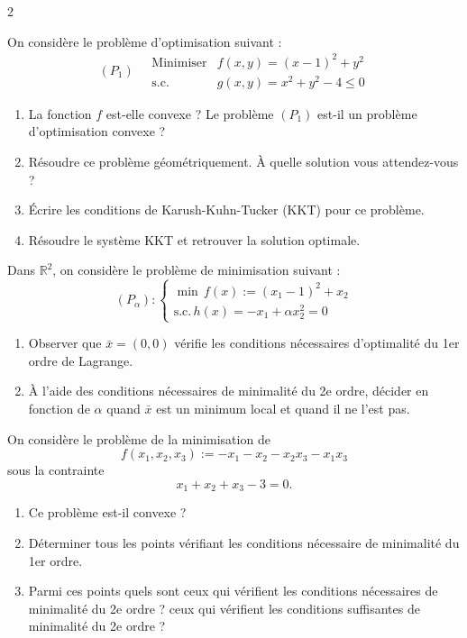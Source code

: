 \begin{multicols}{2}
\begin{exercice}
	On considère le problème d'optimisation suivant :
	$$
	(P_1) \quad
	\begin{array}{ll}
	\text{Minimiser} & f(x,y) = (x-1)^2 + y^2 \\
	\text{s.c.} & g(x,y) = x^2 + y^2 - 4 \le 0
	\end{array}
	$$
	\begin{enumerate}[label=\arabic*.]
		\item La fonction $f$ est-elle convexe ? Le problème $(P_1)$ est-il un problème d'optimisation convexe ?
		\item Résoudre ce problème géométriquement. À quelle solution vous attendez-vous ?
		\item Écrire les conditions de Karush-Kuhn-Tucker (KKT) pour ce problème.
		\item Résoudre le système KKT et retrouver la solution optimale.
	\end{enumerate}
\end{exercice}

\begin{exercice}
	Dans \( \mathbb{R}^2 \), on considère le problème de minimisation suivant :
	\[
	(P_\alpha) :
	\begin{cases}
	\min \,f(x) := (x_1 - 1)^2 + x_2 \\
	\text{s.c.} \, h(x) = -x_1 + \alpha x_2^2 = 0
	\end{cases}
	\]
	\begin{enumerate}[label=\arabic*.,leftmargin=*]
		\item Observer que \( \bar{x} = (0, 0) \) vérifie les conditions nécessaires d’optimalité du 1er ordre de Lagrange.
		\item À l’aide des conditions nécessaires de minimalité du 2e ordre, décider en fonction de \( \alpha \) quand \( \bar{x} \) est un minimum local et quand il ne l’est pas.
	\end{enumerate}
\end{exercice}

\begin{exercice}
	On considère le problème de la minimisation de
	\[
	f(x_1, x_2, x_3) := -x_1 - x_2 - x_2x_3 - x_1x_3
	\]
	sous la contrainte
	\[
	x_1 + x_2 + x_3 - 3 = 0.
	\]
	\begin{enumerate}[label=\arabic*.,leftmargin=*]
		\item Ce problème est-il convexe ?
		\item Déterminer tous les points vérifiant les conditions nécessaire de minimalité du 1er ordre.
		\item Parmi ces points quels sont ceux qui vérifient les conditions nécessaires de minimalité du 2e ordre ? ceux qui vérifient les conditions suffisantes de minimalité du 2e ordre ?
	\end{enumerate}
\end{exercice}


\end{multicols}
